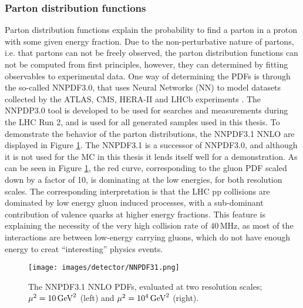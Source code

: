 \subsubsection*{Parton distribution functions}
\noindent
\justify
Parton distribution functions explain the probability to find a parton in a proton with some given energy fraction. 
Due to the non-perturbative nature of partons, i.e. that partons can not be freely observed, the parton distribution functions can not be computed from first principles, however, they can determined by fitting observables to experimental data. 
One way of determining the PDFs is through the so-called NNPDF3.0, that uses Neural Networks (NN) to model datasets collected by the ATLAS, CMS, HERA-II and LHCb experiments \cite{Ball:2014uwa}. 
The NNPDP3.0 tool is developed to be used for searches and measurements during the LHC Run 2, and is used for all generated samples used in this thesis. 
To demonstrate the behavior of the parton distributions, the NNPDF3.1 NNLO are displayed in Figure \ref{fig:NNPDF31}. 
The NNPDF3.1 is a successor of NNPDF3.0, and although it is not used for the MC in this thesis it lends itself well for a demonstration. 
As can be seen in Figure \ref{fig:NNPDF31}, the red curve, corresponding to the gluon PDF scaled down by a factor of 10, is dominating at the low energies, for both resolution scales. 
The corresponding interpretation is that the LHC pp collisions are dominated by low energy gluon induced processes, with a sub-dominant contribution of valence quarks at higher energy fractions. 
This feature is explaining the necessity of the very high collision rate of $40\,$MHz, as most of the interactions are between low-energy carrying gluons, which do not have enough energy to creat ``interesting'' physics events.  
\begin{figure}[!htp]
  \centering
   \texttt{[image: images/detector/NNPDF31.png]}
   \caption{The NNPDF3.1 NNLO PDFs, evaluated at two resolution scales; $\mu^{2}=10\,\text{Ge\hspace{-.08em}V}^{2}$ (left) and  $\mu^{2}=10^{4}\,\text{Ge\hspace{-.08em}V}^{2}$ (right)\cite{Ball:2017nwa}.}
   \label{fig:NNPDF31}
\end{figure}
